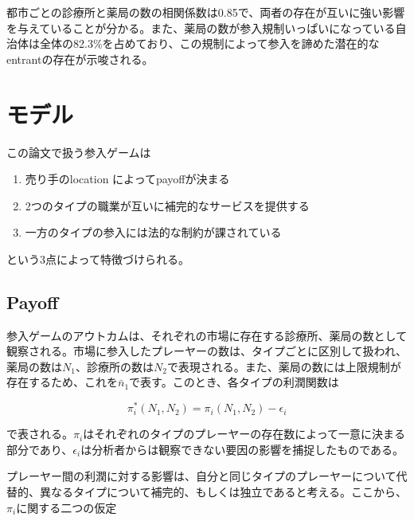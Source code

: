 \documentclass[11pt]{jsarticle}
\begin{document}
都市ごとの診療所と薬局の数の相関係数は0.85で、両者の存在が互いに強い影響を与えていることが分かる。また、薬局の数が参入規制いっぱいになっている自治体は全体の82.3\%を占めており、この規制によって参入を諦めた潜在的なentrantの存在が示唆される。

\section{モデル}

この論文で扱う参入ゲームは

\begin{enumerate}
  \item 売り手のlocation によってpayoffが決まる

  \item 2つのタイプの職業が互いに補完的なサービスを提供する

  \item 一方のタイプの参入には法的な制約が課されている
\end{enumerate}

という3点によって特徴づけられる。


\subsection{Payoff}

参入ゲームのアウトカムは、それぞれの市場に存在する診療所、薬局の数として観察される。市場に参入したプレーヤーの数は、タイプごとに区別して扱われ、薬局の数は$N_1$、診療所の数は$N_2$で表現される。また、薬局の数には上限規制が存在するため、これを$\bar{n}_1$で表す。このとき、各タイプの利潤関数は

\[
\pi^*_i(N_1, N_2) = \pi_i(N_1, N_2) - \epsilon_i
\]

で表される。$\pi_i$はそれぞれのタイプのプレーヤーの存在数によって一意に決まる部分であり、$\epsilon_i$は分析者からは観察できない要因の影響を捕捉したものである。

プレーヤー間の利潤に対する影響は、自分と同じタイプのプレーヤーについて代替的、異なるタイプについて補完的、もしくは独立であると考える。ここから、$\pi_i$に関する二つの仮定
\end{document}
